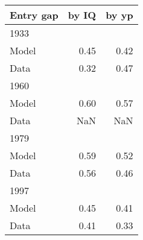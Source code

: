\begin{tabular}{lrr}
\hline
Entry gap & by IQ  & by yp  \\ 
\hline
1933 &   &   \\ 
Model & 0.45  & 0.42  \\ 
Data & 0.32  & 0.47  \\ 
1960 &   &   \\ 
Model & 0.60  & 0.57  \\ 
Data & NaN  & NaN  \\ 
1979 &   &   \\ 
Model & 0.59  & 0.52  \\ 
Data & 0.56  & 0.46  \\ 
1997 &   &   \\ 
Model & 0.45  & 0.41  \\ 
Data & 0.41  & 0.33  \\ 
\hline
\end{tabular}%
